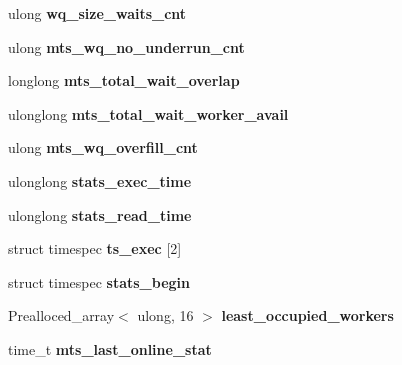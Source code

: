 \begin{DoxyCompactItemize}
ulong {\bfseries wq\+\_\+size\+\_\+waits\+\_\+cnt}
\item 
\mbox{\label{classRelay__log__info_a21ece0de1d3523ea5d5624cafa21539d}} 
ulong {\bfseries mts\+\_\+wq\+\_\+no\+\_\+underrun\+\_\+cnt}
\item 
\mbox{\label{classRelay__log__info_aa5d2bf5bbabb0a3c05b4427517f5b899}} 
longlong {\bfseries mts\+\_\+total\+\_\+wait\+\_\+overlap}
\item 
\mbox{\label{classRelay__log__info_a706a05a7c2f15a1fb5e7c47732718d49}} 
ulonglong {\bfseries mts\+\_\+total\+\_\+wait\+\_\+worker\+\_\+avail}
\item 
\mbox{\label{classRelay__log__info_a802b06a9de3faf9576674f71feb7271f}} 
ulong {\bfseries mts\+\_\+wq\+\_\+overfill\+\_\+cnt}
\item 
\mbox{\label{classRelay__log__info_a5abed3ac1587b04f6c276a37e10345c1}} 
ulonglong {\bfseries stats\+\_\+exec\+\_\+time}
\item 
\mbox{\label{classRelay__log__info_a93c5e43899923697e566fe7249e7b082}} 
ulonglong {\bfseries stats\+\_\+read\+\_\+time}
\item 
\mbox{\label{classRelay__log__info_aea9166d4ac7a5afd4fd8403c22b87e42}} 
struct timespec {\bfseries ts\+\_\+exec} \mbox{[}2\mbox{]}
\item 
\mbox{\label{classRelay__log__info_acbd1e546a4501429089ba85bc1b502c3}} 
struct timespec {\bfseries stats\+\_\+begin}
\item 
\mbox{\label{classRelay__log__info_af1ce47018282180ce343dd487402446c}} 
Prealloced\+\_\+array$<$ ulong, 16 $>$ {\bfseries least\+\_\+occupied\+\_\+workers}
\item 
\mbox{\label{classRelay__log__info_a8e6172455aa9667ddb5bc53ad8e737de}} 
time\+\_\+t {\bfseries mts\+\_\+last\+\_\+online\+\_\+stat}
\item 
\mbox{\label{classRelay__log__info_af99718465f1f94df9c04b21183ea4324}} 

\end{DoxyCompactItemize}

